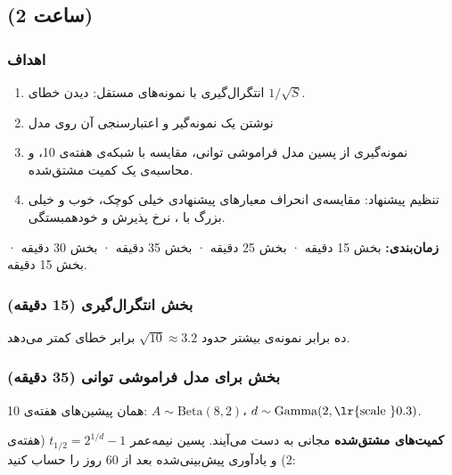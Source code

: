 
\subsection{\texorpdfstring{ (2 ساعت)}{lab (2 ساعت)}}

\subsubsection{اهداف}

\begin{enumerate}
\def\labelenumi{\arabic{enumi}.}
\tightlist
\item
  انتگرال‌گیری  با نمونه‌های مستقل: دیدن خطای
  \(1/\sqrt{S}\).
\item
  نوشتن یک نمونه‌گیر  و اعتبارسنجی آن روی مدل
\item
  نمونه‌گیری از پسین مدل فراموشی توانی، مقایسه با شبکه‌ی هفته‌ی 10، و
  محاسبه‌ی یک کمیت مشتق‌شده.
\item
  تنظیم پیشنهاد: مقایسه‌ی انحراف معیارهای پیشنهادی خیلی کوچک، خوب و خیلی
  بزرگ با ، نرخ پذیرش و خودهمبستگی.
\end{enumerate}

\textbf{زمان‌بندی:} بخش  15 دقیقه · بخش  25 دقیقه · بخش
 35 دقیقه · بخش  30 دقیقه · بخش  15 دقیقه.

\subsubsection{\texorpdfstring{بخش  انتگرال‌گیری 
(15 دقیقه)}{بخش A: انتگرال‌گیری Monte Carlo (15 دقیقه)}}

ده برابر نمونه‌ی بیشتر حدود \(\sqrt{10} \approx 3.2\) برابر خطای
 کمتر می‌دهد.

\subsubsection{\texorpdfstring{بخش  برای مدل فراموشی
توانی (35 دقیقه)}{بخش C: Metropolis برای مدل فراموشی توانی (35 دقیقه)}}

همان پیشین‌های هفته‌ی 10: \(A \sim \mathrm{Beta}(8, 2)\)،
\(d \sim \mathrm{Gamma}(2, \text{\lr{scale }} 0.3)\).

\textbf{کمیت‌های مشتق‌شده} مجانی به دست می‌آیند. پسین نیمه‌عمر
\(t_{1/2} = 2^{1/d} - 1\) (هفته‌ی 2) و یادآوری پیش‌بینی‌شده بعد از 60 روز
را حساب کنید:

